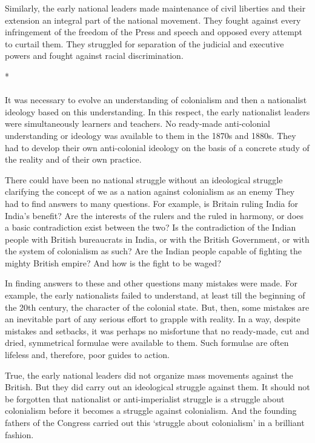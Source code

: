 Similarly, the early national leaders made maintenance of civil liberties and their extension an integral part of the national movement. They fought against every infringement of the freedom of the Press and speech and opposed every attempt to curtail them. They struggled for separation of the judicial and executive powers and fought against racial discrimination.

\begin{center}*\end{center}

\paragraph*{}

It was necessary to evolve an understanding of colonialism and then a nationalist ideology based on this understanding. In this respect, the early nationalist leaders were simultaneously learners and teachers. No ready-made anti-colonial understanding or ideology was available to them in the 1870s and 1880s. They had to develop their own anti-colonial ideology on the basis of a concrete study of the reality and of their own practice.

There could have been no national struggle without an ideological struggle clarifying the concept of we as a nation against colonialism as an enemy They had to find answers to many questions. For example, is Britain ruling India for India's benefit? Are the interests of the rulers and the ruled in harmony, or does a basic contradiction exist between the two? Is the contradiction of the Indian people with British bureaucrats in India, or with the British Government, or with the system of colonialism as such? Are the Indian people capable of fighting the mighty British empire? And how is the fight to be waged?

In finding answers to these and other questions many mistakes were made. For example, the early nationalists failed to understand, at least till the beginning of the 20th century, the character of the colonial state. But, then, some mistakes are an inevitable part of any serious effort to grapple with reality. In a way, despite mistakes and setbacks, it was perhaps no misfortune that no ready-made, cut and dried, symmetrical formulae were available to them. Such formulae are often lifeless and, therefore, poor guides to action.

True, the early national leaders did not organize mass movements against the British. But they did carry out an ideological struggle against them. It should not be forgotten that nationalist or anti-imperialist struggle is a struggle about colonialism before it becomes a struggle against colonialism. And the founding fathers of the Congress carried out this `struggle about colonialism' in a brilliant fashion.

